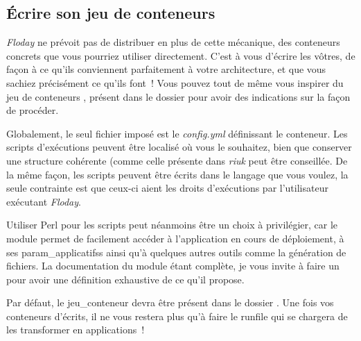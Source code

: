 \subsection{Écrire son jeu de conteneurs}

\emph{Floday} ne prévoit pas de distribuer en plus de cette mécanique, des conteneurs concrets que vous pourriez utiliser directement.
C'est à vous d'écrire les vôtres, de façon à ce qu'ils conviennent parfaitement à votre architecture, et que vous sachiez précisément ce qu'ils font~!
Vous pouvez tout de même vous inspirer du jeu de conteneurs , présent dans le dossier  pour avoir des indications sur la façon de procéder.

Globalement, le seul fichier imposé est le \emph{config.yml} définissant le conteneur.
Les scripts d'exécutions peuvent être localisé où vous le souhaitez, bien que conserver une structure cohérente (comme celle présente dans \emph{riuk} peut être conseillée.
De la même façon, les scripts peuvent être écrits dans le langage que vous voulez, la seule contrainte est que ceux-ci aient les droits d'exécutions par l'utilisateur exécutant \emph{Floday}.

Utiliser Perl pour les scripts peut néanmoins être un choix à privilégier, car le module  permet de facilement accéder à l'\gls{application} en cours de déploiement, à ses \glspl{param_applicatifs} ainsi qu'à quelques autres outils comme la génération de fichiers.
La documentation du module étant complète, je vous invite à faire un  pour avoir une définition exhaustive de ce qu'il propose.

Par défaut, le \gls{jeu_conteneur} devra être présent dans le dossier .
Une fois vos conteneurs d'écrits, il ne vous restera plus qu'à faire le \gls{runfile} qui se chargera de les transformer en applications~!
